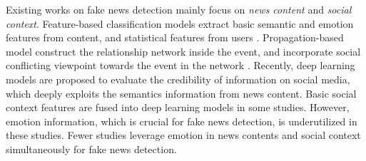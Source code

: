 \documentclass{article}
\newcommand{\kai}[1]{\textcolor{blue}{Kai: {#1}}}
\begin{document}
	
	Existing works on fake news detection mainly focus on {\em news content} and {\em social context}. Feature-based classification models extract basic semantic and emotion features from content, and statistical features from users \cite{castillo2011information}. Propagation-based model construct the relationship network inside the event, and incorporate social conflicting viewpoint towards the event in the network \cite{jin2014news,jin2016news}. Recently, deep learning models are proposed to evaluate the credibility of information on social media, which deeply exploits the semantics information from news content\cite{ma2016detecting}. Basic social context features are fused into deep learning models in some studies\cite{guo2018rumor}. However, emotion information, which is crucial for fake news detection, is underutilized in these studies. Fewer studies leverage emotion in news contents and social context simultaneously for fake news detection.
	
	
\end{document}
